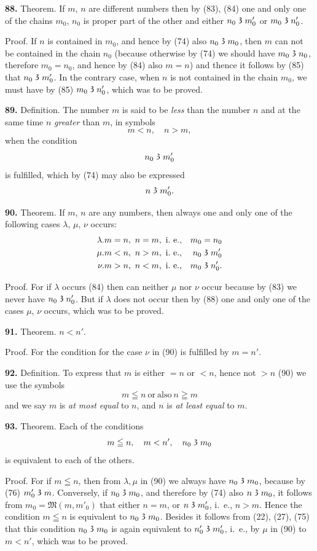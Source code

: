 \documentclass[oneside]{book}
\newcommand\partof{\mathrel{\raisebox{0.45ex}{$\mathfrak{3}$}}}   %
\newcommand\mypara{\medskip\textbf}
\begin{document}
\mypara{88.} Theorem. If $m$, $n$ are different numbers then
by (83), (84) one and only one of the chains $m_0$, $n_0$ is
proper part of the other and either $n_0 \partof m'_0$ or $m_0 \partof n'_0$.

Proof. If $n$ is contained in $m_0$, and hence by (74)
also $n_0 \partof m_0$, then $m$ can not be contained in the chain $n_0$
(because otherwise by (74) we should have $m_0 \partof n_0$,
therefore $m_0 = n_0$, and hence by (84) also $m = n$) and
thence it follows by (85) that $n_0 \partof m'_0$. In the contrary
case, when $n$ is not contained in the chain $m_0$, we must
have by (85) $m_0 \partof n'_0$, which was to be proved.

\mypara{89.} Definition. The number $m$ is said to be \textit{less}
than the number $n$ and at the same time $n$ \textit{greater} than
$m$, in symbols
\[
m < n, \quad n >m,
\]
when the condition
\[
n_0 \partof m'_0
\]
is fulfilled, which by (74) may also be expressed
\[
n \partof m'_0.
\]

\mypara{90.} Theorem. If $m$, $n$ are any numbers, then always
one and only one of the following cases $\lambda$, $\mu$, $\nu$
occurs:
\begin{eqnarray*}
\lambda.& m = n,\ n = m,\ \mathrm{i.~e.}, &m_0 = n_0\\
\mu.    & m < n,\ n > m,\ \mathrm{i.~e.}, &n_0 \partof m'_0\\
\nu.    & m > n,\ n < m,\ \mathrm{i.~e.}, &m_0 \partof n'_0.
\end{eqnarray*}

Proof. For if $\lambda$ occurs (84) then can neither $\mu$
nor $\nu$ occur because by (83) we never have $n_0 \partof n'_0$. But
if $\lambda$ does not occur then by (88) one and only one of
the cases $\mu$, $\nu$ occurs, which was to be proved.

\mypara{91.} Theorem. $n<n'$.

Proof. For the condition for the case $\nu$ in (90) is
fulfilled by $m = n'$.

\mypara{92.} Definition.  To express that $m$ is either $=n$
or $< n$, hence not $> n$ (90) we use the symbols
\[
m\leqq n \mathrm{\ or\ also\ } n\geqq m
\]
and we say $m$ is \textit{at most equal} to $n$, and $n$ is \textit{at least
equal} to $m$.

\mypara{93.} Theorem.  Each of the conditions
\[
m \leqq n,\quad m<n',\quad n_0 \partof m_0
\]
is equivalent to each of the others.

Proof. For if $m \leqq n$, then from $\lambda, \mu$ in (90) we
always have $n_0 \partof m_0$, because by (76) $m'_0 \partof m$. Conversely,
if $n_0 \partof m_0$, and therefore by (74) also $n \partof m_0$, it follows
from $m_0 = \mathfrak{M}(m, m'_0)$ that either $n = m$, or $n \partof m'_0$,
i.~e., $n>m$. Hence the condition $m \leqq n$ is equivalent
to $n_0 \partof m_0$. Besides it follows from (22), (27), (75)
that this condition $n_0 \partof m_0$ is again equivalent to $n'_0 \partof m'_0$,
i.~e., by $\mu$ in (90) to $m<n'$, which was to be proved.
\end{document}
